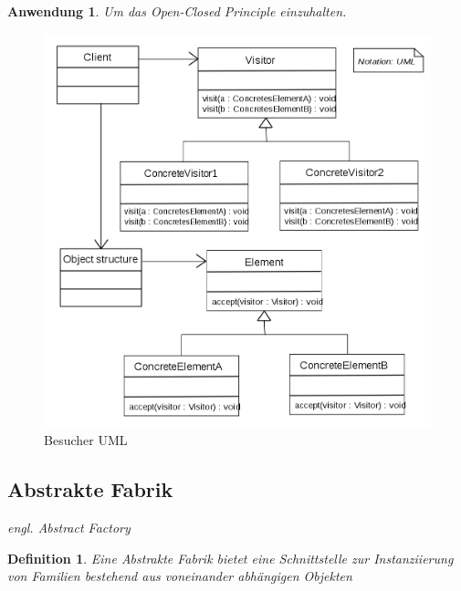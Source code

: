\documentclass[a4paper]{article}
\theoremstyle{break}
\newtheorem{defi}{Definition}[section]
\newtheorem{why}{Anwendung}[section]
\begin{document}
\begin{why}
	Um das Open-Closed Principle einzuhalten.
\end{why}
\begin{figure}[H]
	\centering
	\includegraphics[width=\textwidth]{../diagrams/uml/VisitorPattern.png}
	\caption{Besucher UML}
\end{figure}




\newpage
\subsection{Abstrakte Fabrik}

\textit{engl. Abstract Factory}

\begin{defi}
	Eine Abstrakte Fabrik bietet eine Schnittstelle zur Instanziierung von Familien bestehend aus voneinander abhängigen Objekten
\end{defi}
\end{document}
